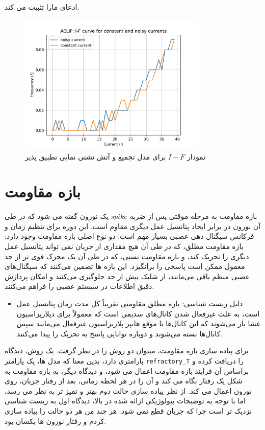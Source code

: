 \documentclass{article}
\begin{document}
                ادعای مارا تثبیت می کند.
                \begin{figure}[H]
                    \centering
                    \includegraphics[width=0.8\textwidth]{plots/AELIF: I-F curve for constant and noisy currents.pdf} 
                    \caption{نمودار $I-F$ برای مدل تجمیع و آتش نشتی نمایی تطبیق پذیر  }
                    \label{fig:aelif-noise-curr-I-F}
                \end{figure}
\newpage
    \section{بازه مقاومت}
        بازه مقاومت به مرحله موقتی پس از ضربه
        $spike$ 
        یک نورون گفته می شود که در طی آن نورون در برابر ایجاد پتانسیل عمل دیگری مقاوم است. این دوره برای تنظیم زمان و فرکانس سیگنال دهی عصبی بسیار مهم است. دو نوع اصلی بازه مقاومت وجود دارد: بازه مقاومت مطلق، که در طی آن هیچ مقداری از جریان نمی تواند پتانسیل عمل دیگری را تحریک کند، و بازه مقاومت نسبی، که در طی آن یک محرک قوی تر از حد معمول ممکن است پاسخی را برانگیزد. این بازه ها تضمین می‌کنند که سیگنال‌های عصبی منظم باقی می‌مانند، از شلیک بیش از حد جلوگیری می‌کنند و امکان پردازش دقیق اطلاعات در سیستم عصبی را فراهم می‌کنند.

        \begin{itemize}
            \item دلیل زیست شناسی: بازه مطلق مقاومتی تقریباً کل مدت زمان پتانسیل عمل است، به علت غیرفعال شدن کانال‌های سدیمی است که معمولاً برای دپلاریزاسیون غشا باز می‌شوند که این کانال‌ها تا موقع هایپر پلاریزاسیون غیرفعال می‌مانند سپس کانال‌ها بسته می‌شوند و دوباره توانایی پاسخ به تحریک را پیدا می‌کنند.\cite{wikipedia-refractory-period}
        \end{itemize}
        برای پیاده سازی بازه مقاومت، میتوان دو روش را در نظر گرفت. یک روش، دیدگاه پارامتری دارد، بدین معنا که مدل ها، یک پارامتر 
        \texttt{refractory\_T} 
        را دریافت کرده و براساس آن فرایند بازه مقاومت اعمال می شود، و دیدگاه دیگر، به بازه مقاومت به شکل یک رفتار نگاه می کند و آن را در هر لحظه زمانی، بعد از رفتار جریان، روی نورون اعمال می کند. از نظر پیاده سازی حالت دوم بهتر و تمیز تر به نظر می رسد، اما با توجه به توضیحات بیولوژیکی ارائه شده در بالا، دیدگاه اول به زیست شناسی نزدیک تر است چرا که جریان قطع نمی شود. هر چند من هر دو حالت را پیاده سازی کردم و رفتار نورون ها یکسان بود.
\end{document}
